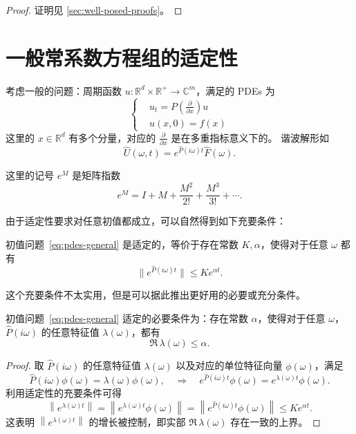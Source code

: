 \begin{proof}
    证明见 \ref{sec:well-posed-proofs}。
\end{proof}

\section{一般常系数方程组的适定性}

考虑一般的问题：周期函数 $u: \mathbb{R}^d  \times \mathbb{R}^+ \to \mathbb{C}^{m}$，满足的 PDEs 为
\begin{equation}
    \left\{
    \begin{aligned}
         & u_t = P(\frac{\partial}{\partial x}) u \\
         & u(x,0) = f(x)
    \end{aligned}
    \right.
    \label{eq:pdes-general}
\end{equation}
这里的 $x \in \mathbb{R}^d$ 有多个分量，对应的 $\frac{\partial}{\partial x}$ 是在多重指标意义下的。
谐波解形如
\[
    \widehat{U}(\omega ,t) = e^{\widehat{P}(i \omega )t} \widehat{F}(\omega ).
\]

\begin{remark}
    这里的记号 $e^M$ 是矩阵指数
    \[
        e^M = I + M + \frac{M^2}{2!} + \frac{M^3}{3!} + \cdots.
    \]
\end{remark}

由于适定性要求对任意初值都成立，可以自然得到如下充要条件：
\begin{theorem}
    初值问题~\eqref{eq:pdes-general} 是适定的，等价于存在常数 $K,\alpha$，使得对于任意 $\omega $ 都有
    \[
        \| e^{\widehat{P}(i \omega )t} \| \le K e^{\alpha t}.
    \]
\end{theorem}

这个充要条件不太实用，但是可以据此推出更好用的必要或充分条件。
\begin{theorem}
    初值问题~\eqref{eq:pdes-general} 适定的必要条件为：存在常数 $\alpha$，使得对于任意 $\omega $，$\widehat{P}(i \omega)$ 的任意特征值 $\lambda(\omega )$，都有
    \[
        \Re\, \lambda(\omega ) \le \alpha.
    \]
\end{theorem}

\begin{proof}
    取 $\widehat{P}(i \omega)$ 的任意特征值 $\lambda(\omega )$ 以及对应的单位特征向量 $\phi(\omega )$，满足
    \[
        \widehat{P}(i \omega) \phi(\omega ) = \lambda(\omega ) \phi(\omega ),\quad \Rightarrow \quad e^{\widehat{P}(i \omega)t} \phi(\omega ) = e^{\lambda(\omega )t} \phi(\omega ).
    \]
    利用适定性的充要条件可得
    \[
        \left\|e^{\lambda(\omega )t}\right\|  = \left\|e^{\lambda(\omega )t} \phi(\omega ) \right\|
        = \left\| e^{\widehat{P}(i \omega)t} \phi(\omega )\right\| \le K e^{\alpha t}.
    \]
    这表明 $\left\|e^{\lambda(\omega )t}\right\|$ 的增长被控制，即实部 $\Re\, \lambda(\omega )$ 存在一致的上界。
\end{proof}

